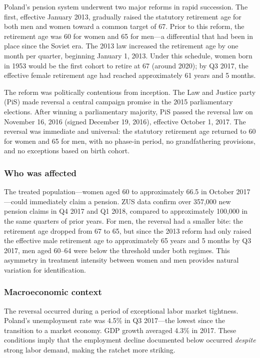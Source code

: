 \documentclass[12pt]{article}
\begin{document}
Poland's pension system underwent two major reforms in rapid succession. The first, effective January 2013, gradually raised the statutory retirement age for both men and women toward a common target of 67. Prior to this reform, the retirement age was 60 for women and 65 for men---a differential that had been in place since the Soviet era. The 2013 law increased the retirement age by one month per quarter, beginning January 1, 2013. Under this schedule, women born in 1953 would be the first cohort to retire at 67 (around 2020); by Q3 2017, the effective female retirement age had reached approximately 61 years and 5 months.

The reform was politically contentious from inception. The Law and Justice party (PiS) made reversal a central campaign promise in the 2015 parliamentary elections. After winning a parliamentary majority, PiS passed the reversal law on November 16, 2016 (signed December 19, 2016), effective October 1, 2017. The reversal was immediate and universal: the statutory retirement age returned to 60 for women and 65 for men, with no phase-in period, no grandfathering provisions, and no exceptions based on birth cohort.

\subsubsection*{Who was affected} The treated population---women aged 60 to approximately 66.5 in October 2017---could immediately claim a pension. ZUS data confirm over 357,000 new pension claims in Q4 2017 and Q1 2018, compared to approximately 100,000 in the same quarters of prior years. For men, the reversal had a smaller bite: the retirement age dropped from 67 to 65, but since the 2013 reform had only raised the effective male retirement age to approximately 65 years and 5 months by Q3 2017, men aged 60--64 were below the threshold under both regimes. This asymmetry in treatment intensity between women and men provides natural variation for identification.

\subsubsection*{Macroeconomic context} The reversal occurred during a period of exceptional labor market tightness. Poland's unemployment rate was 4.5\% in Q3 2017---the lowest since the transition to a market economy. GDP growth averaged 4.3\% in 2017. These conditions imply that the employment decline documented below occurred \textit{despite} strong labor demand, making the ratchet more striking.
\end{document}
